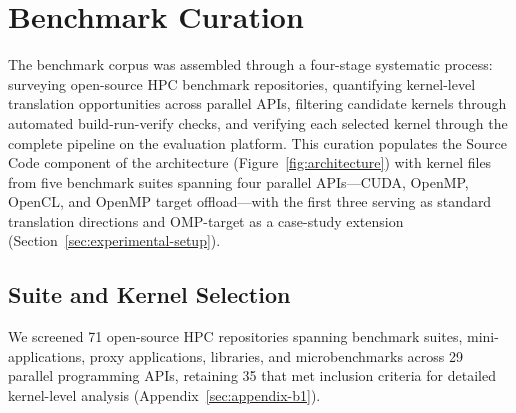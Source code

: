 %

\section{Benchmark Curation}
\label{sec:benchmark-curation}
The benchmark corpus was assembled through a four-stage systematic process: surveying open-source HPC benchmark repositories, quantifying kernel-level translation opportunities across parallel APIs, filtering candidate kernels through automated build-run-verify checks, and verifying each selected kernel through the complete pipeline on the evaluation platform. This curation populates the Source Code component of the \parbench{} architecture (Figure~\ref{fig:architecture}) with kernel files from five benchmark suites spanning four parallel APIs---CUDA, OpenMP, OpenCL, and OpenMP target offload---with the first three serving as standard translation directions and OMP-target as a case-study extension (Section~\ref{sec:experimental-setup}).

\subsection{Suite and Kernel Selection}
\label{sec:suite-selection}

We screened 71 open-source HPC repositories spanning benchmark suites, mini-applications, proxy applications, libraries, and microbenchmarks across 29 parallel programming APIs, retaining 35 that met inclusion criteria for detailed kernel-level analysis (Appendix~\ref{sec:appendix-b1}).

